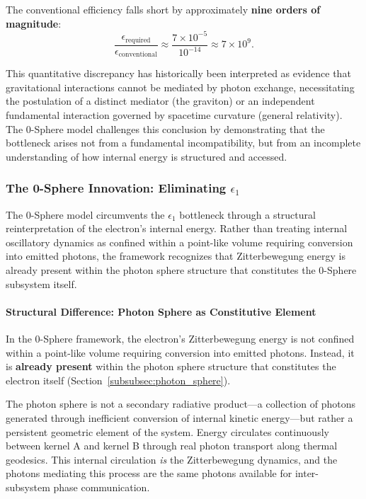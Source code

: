 \documentclass[12pt,letterpaper]{article}
\begin{document}
The conventional efficiency falls short by approximately \textbf{nine orders of magnitude}:
\begin{equation}
\frac{\epsilon_{\text{required}}}{\epsilon_{\text{conventional}}} \approx \frac{7 \times 10^{-5}}{10^{-14}} \approx 7 \times 10^{9}.
\end{equation}

This quantitative discrepancy has historically been interpreted as evidence that gravitational interactions cannot be mediated by photon exchange, necessitating the postulation of a distinct mediator (the graviton) or an independent fundamental interaction governed by spacetime curvature (general relativity). The 0-Sphere model challenges this conclusion by demonstrating that the bottleneck arises not from a fundamental incompatibility, but from an incomplete understanding of how internal energy is structured and accessed.

\subsubsection{The 0-Sphere Innovation: Eliminating $\epsilon_1$}
\label{subsubsec:eliminating_epsilon1}

The 0-Sphere model circumvents the $\epsilon_1$ bottleneck through a structural reinterpretation of the electron's internal energy. Rather than treating internal oscillatory dynamics as confined within a point-like volume requiring conversion into emitted photons, the framework recognizes that Zitterbewegung energy is already present within the photon sphere structure that constitutes the 0-Sphere subsystem itself.

\paragraph{Structural Difference: Photon Sphere as Constitutive Element}

In the 0-Sphere framework, the electron's Zitterbewegung energy is not confined within a point-like volume requiring conversion into emitted photons. Instead, it is \textbf{already present} within the photon sphere structure that constitutes the electron itself (Section~\ref{subsubsec:photon_sphere}).

The photon sphere is not a secondary radiative product—a collection of photons generated through inefficient conversion of internal kinetic energy—but rather a persistent geometric element of the system. Energy circulates continuously between kernel A and kernel B through real photon transport along thermal geodesics. This internal circulation \textit{is} the Zitterbewegung dynamics, and the photons mediating this process are the same photons available for inter-subsystem phase communication.
\end{document}
